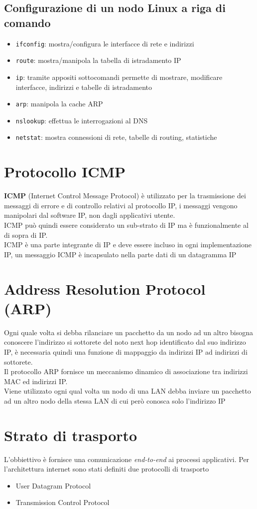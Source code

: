 \documentclass[italian,12pt,a4paper]{article}
\begin{document}
\subsection{Configurazione di un nodo Linux a riga di comando}
\begin{itemize}
	\item \verb|ifconfig|: mostra/configura le interfacce di rete e indirizzi
	\item \verb|route|: mostra/manipola la tabella di istradamento IP
	\item \verb|ip|: tramite appositi sottocomandi permette di mostrare, modificare interfacce, indirizzi e tabelle di istradamento
	\item \verb|arp|: manipola la cache ARP
	\item \verb|nslookup|: effettua le interrogazioni al DNS
	\item \verb|netstat|: mostra connessioni di rete, tabelle di routing, statistiche
\end{itemize}
\section{Protocollo ICMP}
\textbf{ICMP} (Internet Control Message Protocol) è utilizzato per la trasmissione dei messaggi di errore e di controllo relativi al protocollo IP, i messaggi vengono manipolari dal software IP, non dagli applicativi utente.\\
ICMP può quindi essere considerato un sub-strato di IP ma è funzionalmente al di sopra di IP.\\
ICMP è una parte integrante di IP e deve essere incluso in ogni implementazione IP, un messaggio ICMP è incapsulato nella parte dati di un datagramma IP
\section{Address Resolution Protocol (ARP)}
Ogni quale volta si debba rilanciare un pacchetto da un nodo ad un altro bisogna conoscere l'indirizzo si sottorete del noto next hop identificato dal suo indirizzo IP, è necessaria quindi una funzione di mappaggio da indirizzi IP ad indirizzi di sottorete.\\
Il protocollo ARP fornisce un meccanismo dinamico di associazione tra indirizzi MAC ed indirizzi IP.\\
Viene utilizzato ogni qual volta un nodo di una LAN debba inviare un pacchetto ad un altro nodo della stessa LAN di cui però conosca solo l'indirizzo IP
\section{Strato di trasporto}
L'obbiettivo è fornisce una comunicazione \textit{end-to-end} ai processi applicativi. Per l'architettura internet sono stati definiti due protocolli di trasporto
\begin{itemize}
	\item User Datagram Protocol
	\item Transmission Control Protocol
\end{itemize}
\end{document}

